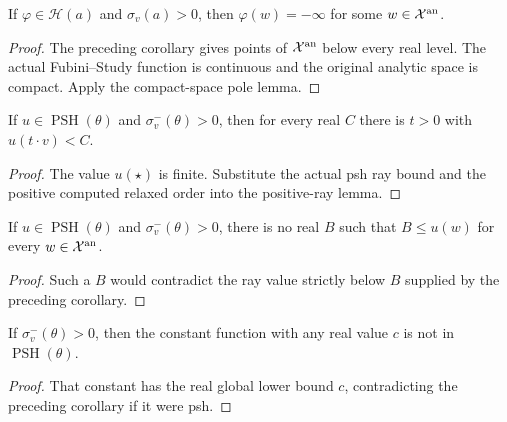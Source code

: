 \begin{corollary}
\label{cor:fp-fs-pole}
\leanok
{}
If $\varphi\in\mathcal H(a)$ and $\sigma_v(a)>0$, then
$\varphi(w)=-\infty$ for some $w\in\mathcal X^{\mathrm{an}}$.
\end{corollary}
\begin{proof}
The preceding corollary gives points of $\mathcal X^{\mathrm{an}}$ below every
real level.  The actual Fubini--Study function is continuous and the
original analytic space is compact.  Apply the compact-space pole lemma.
\end{proof}

\begin{corollary}
\label{cor:fp-psh-ray-decay}
\leanok
{}
If $u\in\operatorname{PSH}(\theta)$ and $\sigma^-_v(\theta)>0$,
then for every real $C$ there is $t>0$ with $u(t\cdot v)<C$.
\end{corollary}
\begin{proof}
The value $u(\star)$ is finite.  Substitute the actual psh ray bound
and the positive computed relaxed order into the positive-ray lemma.
\end{proof}

\begin{corollary}
\label{cor:fp-no-real-lower-bound}
\leanok
{}
If $u\in\operatorname{PSH}(\theta)$ and $\sigma^-_v(\theta)>0$,
there is no real $B$ such that $B\le u(w)$ for every
$w\in\mathcal X^{\mathrm{an}}$.
\end{corollary}
\begin{proof}
Such a $B$ would contradict the ray value strictly below $B$ supplied
by the preceding corollary.
\end{proof}

\begin{corollary}
\label{cor:fp-no-constant-psh}
\leanok
{}
If $\sigma^-_v(\theta)>0$, then the constant function with any real
value $c$ is not in $\operatorname{PSH}(\theta)$.
\end{corollary}
\begin{proof}
That constant has the real global lower bound $c$, contradicting the
preceding corollary if it were psh.
\end{proof}

